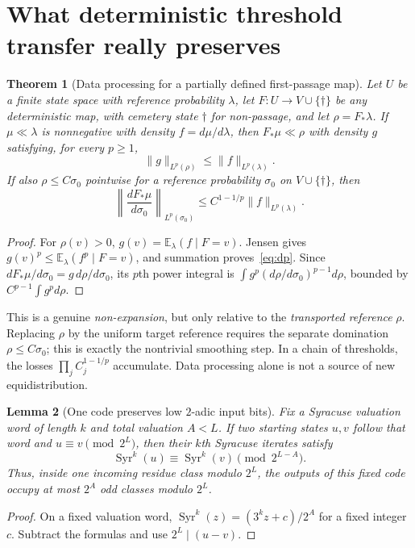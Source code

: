 \documentclass[10pt]{amsart}
\newtheorem{theorem}{Theorem}
\newtheorem{lemma}[theorem]{Lemma}
\theoremstyle{definition}\newtheorem{definition}[theorem]{Definition}
\theoremstyle{remark}\newtheorem{remark}[theorem]{Remark}
\newcommand{\Syr}{\operatorname{Syr}}
\newcommand{\E}{\mathbb E}
\begin{document}
\section{What deterministic threshold transfer really preserves}
\begin{theorem}[Data processing for a partially defined first-passage map]\label{thm:dp}
Let $U$ be a finite state space with reference probability $\lambda$, let $F:U\to V\cup\{\dagger\}$ be any deterministic map, with cemetery state $\dagger$ for non-passage, and let $\rho=F_*\lambda$. If $\mu\ll\lambda$ is nonnegative with density $f=d\mu/d\lambda$, then $F_*\mu\ll\rho$ with density $g$ satisfying, for every $p\ge1$,
\begin{equation}\label{eq:dp}
 \|g\|_{L^p(\rho)}\le\|f\|_{L^p(\lambda)}.
\end{equation}
If also $\rho\le C\sigma_0$ pointwise for a reference probability $\sigma_0$ on $V\cup\{\dagger\}$, then
\begin{equation}\label{eq:change}
 \left\|\frac{dF_*\mu}{d\sigma_0}\right\|_{L^p(\sigma_0)}
 \le C^{1-1/p}\|f\|_{L^p(\lambda)}.
\end{equation}
\end{theorem}
\begin{proof}
For $\rho(v)>0$, $g(v)=\E_\lambda(f\mid F=v)$. Jensen gives $g(v)^p\le\E_\lambda(f^p\mid F=v)$, and summation proves~\eqref{eq:dp}. Since $dF_*\mu/d\sigma_0=g\,d\rho/d\sigma_0$, its $p$th power integral is $\int g^p(d\rho/d\sigma_0)^{p-1}d\rho$, bounded by $C^{p-1}\int g^p d\rho$.
\end{proof}

This is a genuine \emph{non-expansion}, but only relative to the \emph{transported reference} $\rho$. Replacing $\rho$ by the uniform target reference requires the separate domination $\rho\le C\sigma_0$; this is exactly the nontrivial smoothing step. In a chain of thresholds, the losses $\prod_j C_j^{1-1/p}$ accumulate. Data processing alone is not a source of new equidistribution.

\begin{lemma}[One code preserves low $2$-adic input bits]\label{lem:bits}
Fix a Syracuse valuation word of length $k$ and total valuation $A<L$. If two starting states $u,v$ follow that word and $u\equiv v\pmod{2^L}$, then their $k$th Syracuse iterates satisfy
\[
 \Syr^k(u)\equiv\Syr^k(v)\pmod{2^{L-A}}.
\]
Thus, inside one incoming residue class modulo $2^L$, the outputs of this fixed code occupy at most $2^A$ odd classes modulo $2^L$.
\end{lemma}
\begin{proof}
On a fixed valuation word, $\Syr^k(z)=(3^kz+c)/2^A$ for a fixed integer $c$. Subtract the formulas and use $2^L\mid(u-v)$.
\end{proof}
\end{document}
